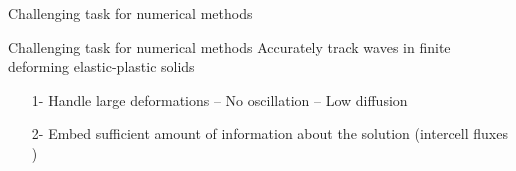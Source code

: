 \begin{withoutheadline}
\begin{frame}{\text{  }}
\begin{overprint}
\begin{block}{Challenging task for numerical methods}
\begin{itemize}
        \end{itemize}
      \end{block}
      \vspace{-0.9cm}
      \begin{block}{}
        \centering
        
      \end{block}
      \vspace{-0.5cm}
      \begin{block}{Challenging task for numerical methods}
        \alert{Accurately track waves in finite deforming elastic-plastic solids}
        \begin{itemize}
        \item[1-] Handle large deformations -- No oscillation -- Low diffusion
        \item[2-] Embed sufficient amount of information about the solution (intercell fluxes \cite{Thomas_EP})
        \end{itemize}
      \end{block}


\end{overprint}
\end{frame}
\end{withoutheadline}

